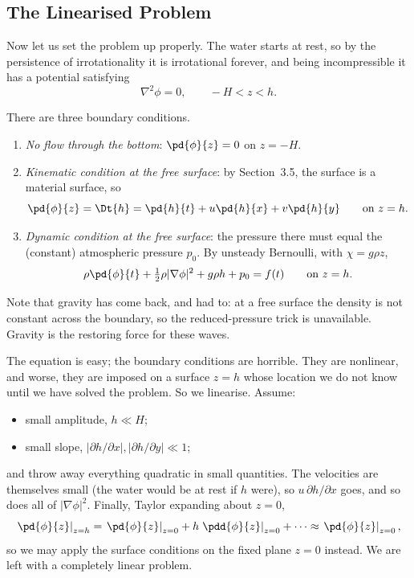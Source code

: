 \subsection{The Linearised Problem}

Now let us set the problem up properly. The water starts at rest, so by the persistence of irrotationality it is irrotational forever, and being incompressible it has a potential satisfying
$$
\nabla^2 \phi = 0, \qquad -H < z < h.
$$

There are three boundary conditions.

\begin{enumerate}[label=(\roman*)]
	\item \emph{No flow through the bottom}: $\displaystyle \pd{\phi}{z} = 0$ on $z = -H$.
	\item \emph{Kinematic condition at the free surface}: by Section~3.5, the surface is a material surface, so
	$$
	\pd{\phi}{z} = \Dt{h} = \pd{h}{t} + u\pd{h}{x} + v\pd{h}{y} \qquad \text{on } z = h.
	$$
	\item \emph{Dynamic condition at the free surface}: the pressure there must equal the (constant) atmospheric pressure $p_0$. By unsteady Bernoulli, with $\chi = g\rho z$,
	$$
	\rho\pd{\phi}{t} + \tfrac{1}{2}\rho|\nabla\phi|^2 + g\rho h + p_0 = f(t) \qquad \text{on } z = h.
	$$
\end{enumerate}

Note that gravity has come back, and had to: at a free surface the density is not constant across the boundary, so the reduced-pressure trick is unavailable. Gravity is the restoring force for these waves.

The equation is easy; the boundary conditions are horrible. They are nonlinear, and worse, they are imposed on a surface $z = h$ whose location we do not know until we have solved the problem. So we linearise. Assume:
\begin{itemize}
	\item small amplitude, $h \ll H$;
	\item small slope, $|\partial h/\partial x|, |\partial h/\partial y| \ll 1$;
\end{itemize}
and throw away everything quadratic in small quantities. The velocities are themselves small (the water would be at rest if $h$ were), so $u \,\partial h/\partial x$ goes, and so does all of $|\nabla\phi|^2$. Finally, Taylor expanding about $z = 0$,
$$
\left.\pd{\phi}{z}\right|_{z=h} = \left.\pd{\phi}{z}\right|_{z=0} + h\left.\pdd{\phi}{z}\right|_{z=0} + \cdots \approx \left.\pd{\phi}{z}\right|_{z=0},
$$
so we may apply the surface conditions on the fixed plane $z = 0$ instead. We are left with a completely linear problem.

